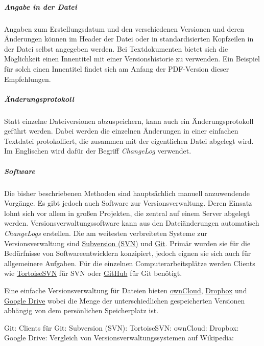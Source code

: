 \subparagraph{Angabe in der Datei} Angaben zum Erstellungsdatum und den verschiedenen Versionen und deren Änderungen können im Header der Datei oder in standardisierten Kopfzeilen in der Datei selbst angegeben werden. Bei Textdokumenten bietet sich die Möglichkeit einen Innentitel mit einer Versionshistorie zu verwenden. Ein Beispiel für solch einen Innentitel findet sich am Anfang der PDF-Version dieser Empfehlungen.

\subparagraph{Änderungsprotokoll} Statt einzelne Dateiversionen abzuspeichern, kann auch ein Änderungsprotokoll geführt werden. Dabei werden die einzelnen Änderungen in einer einfachen Textdatei protokolliert, die zusammen mit der eigentlichen Datei abgelegt wird. Im Englischen wird dafür der Begriff \emph{ChangeLog} verwendet.

\subparagraph{Software} Die bisher beschriebenen Methoden sind hauptsächlich manuell anzuwendende Vorgänge. Es gibt jedoch auch Software zur Versionsverwaltung. Deren Einsatz lohnt sich vor allem in großen Projekten, die zentral auf einem Server abgelegt werden. Versionsverwaltungssoftware kann aus den Dateiänderungen automatisch \emph{ChangeLogs} erstellen. Die am weitesten verbreiteten Systeme zur Versionsverwaltung sind \href{http://subversion.apache.org/}{Subversion (SVN)} und \href{https://git-scm.com/}{Git}. Primär wurden sie für die Bedürfnisse von Softwareentwicklern konzipiert, jedoch eignen sie sich auch für allgemeinere Aufgaben. Für die einzelnen Computerarbeitsplätze werden Clients wie \href{https://tortoisesvn.net/}{TortoiseSVN} für SVN oder \href{https://windows.github.com/}{GitHub} für Git benötigt.

Eine einfache Versionsverwaltung für Dateien bieten \href{https://owncloud.org/}{ownCloud}, \href{https://www.dropbox.com/}{Dropbox} und \href{https://drive.google.com/drive/}{Google Drive} wobei die Menge der unterschiedlichen gespeicherten Versionen abhängig von dem persönlichen Speicherplatz ist.

\begin{flushleft}
Git: 
Clients für Git: 
Subversion (SVN): 
TortoiseSVN: 
ownCloud: 
Dropbox: 
Google Drive: 
Vergleich von Versionsverwaltungssystemen auf Wikipedia: 
\end{flushleft}